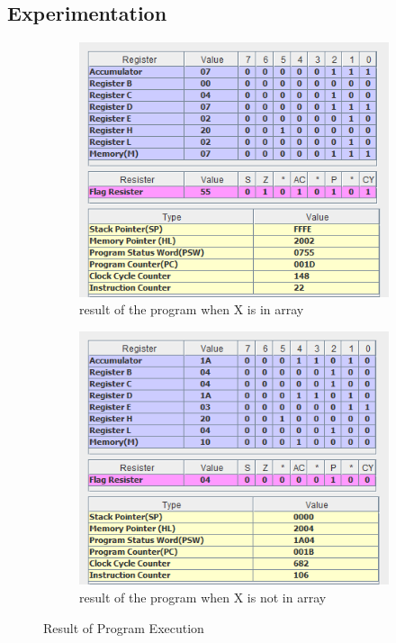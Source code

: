 \documentclass[a4paper]{article} %
\begin{document}
    \subsection{Experimentation}
    \begin{figure}[h!]
        \centering
        \begin{subfigure}[b]{0.49\linewidth}
            \centering
            \includegraphics[width=\linewidth]{Assignment 4/2_BS/found.png}
            \caption{result of the program when X is in array}
            \label{fg10a}
        \end{subfigure}
        \begin{subfigure}[b]{0.49\linewidth}
            \centering
            \includegraphics[width=\linewidth]{Assignment 4/2_BS/not_found.png}
            \caption{result of the program when X is not in array}
            \label{fg10b}
        \end{subfigure}
        \caption{Result of Program Execution}
        \label{fg10}
    \end{figure}
\end{document}
